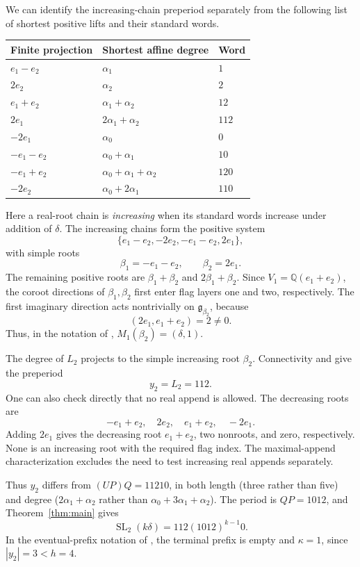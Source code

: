 \documentclass[11pt]{amsart}
\numberwithin{equation}{section}
\theoremstyle{definition}
\DeclareMathOperator{\SL}{SL}
\newcommand{\Q}{\mathbb Q}
\newcommand{\g}{\mathfrak g}
\begin{document}
We can identify the increasing-chain preperiod separately from the following list of shortest positive lifts and their standard words.
\begin{center}
\begin{tabular}{lll}
\toprule
Finite projection & Shortest affine degree & Word\\
\midrule
$e_1-e_2$ & $\alpha_1$ & $1$\\
$2e_2$ & $\alpha_2$ & $2$\\
$e_1+e_2$ & $\alpha_1+\alpha_2$ & $12$\\
$2e_1$ & $2\alpha_1+\alpha_2$ & $112$\\
$-2e_1$ & $\alpha_0$ & $0$\\
$-e_1-e_2$ & $\alpha_0+\alpha_1$ & $10$\\
$-e_1+e_2$ & $\alpha_0+\alpha_1+\alpha_2$ & $120$\\
$-2e_2$ & $\alpha_0+2\alpha_1$ & $110$\\
\bottomrule
\end{tabular}
\end{center}
Here a real-root chain is \emph{increasing} when its standard words increase under addition of $\delta$. The increasing chains form the positive system
\[
 \{e_1-e_2,-2e_2,-e_1-e_2,2e_1\},
\]
with simple roots
\[
 \beta_1=-e_1-e_2,\qquad\beta_2=2e_1.
\]
The remaining positive roots are $\beta_1+\beta_2$ and $2\beta_1+\beta_2$. Since $V_1=\Q(e_1+e_2)$, the coroot directions of $\beta_1,\beta_2$ first enter flag layers one and two, respectively. The first imaginary direction acts nontrivially on $\g_{\beta_2}$, because
\[
 (2e_1,e_1+e_2)=2\ne0.
\]
Thus, in the notation of \cite{ETC}, $M_1(\beta_2)=(\delta,1)$.

The degree of $L_2$ projects to the simple increasing root $\beta_2$. Connectivity and \cite[Definition~6.10 and Corollary~6.15]{ETC} give the preperiod
\begin{equation}\label{eq:c2-preperiod}
 y_2=L_2=112.
\end{equation}
One can also check directly that no real append is allowed. The decreasing roots are
\[
 -e_1+e_2,\quad2e_2,\quad e_1+e_2,\quad-2e_1.
\]
Adding $2e_1$ gives the decreasing root $e_1+e_2$, two nonroots, and zero, respectively. None is an increasing root with the required flag index. The maximal-append characterization \cite[Lemma~6.9]{ETC} excludes the need to test increasing real appends separately.

Thus $y_2$ differs from $(UP)Q=11210$, in both length (three rather than five) and degree ($2\alpha_1+\alpha_2$ rather than $\alpha_0+3\alpha_1+\alpha_2$). The period is $QP=1012$, and Theorem~\ref{thm:main} gives
\[
 \SL_2(k\delta)=112(1012)^{k-1}0.
\]
In the eventual-prefix notation of \cite[Lemma~6.45]{ETC}, the terminal prefix is empty and $\kappa=1$, since $|y_2|=3<h=4$.
\end{document}
